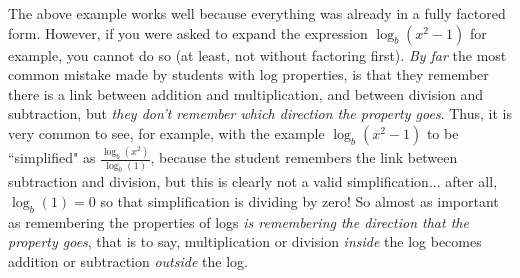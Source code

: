     The above example works well because everything was already in a fully factored form. However, if you were asked to expand the expression $\log_b(x^2-1)$ for example, you cannot do so (at least, not without factoring first). \textit{By far} the most common mistake made by students with log properties, is that they remember there is a link between addition and multiplication, and between division and subtraction, but \textit{they don't remember which direction the property goes}. Thus, it is very common to see, for example, with the example $\log_b(x^2-1)$ to be ``simplified" as $\frac{\log_b(x^2)}{\log_b(1)}$, because the student remembers the link between subtraction and division, but this is clearly not a valid simplification... after all, $\log_b(1) = 0$ so that simplification is dividing by zero! So almost as important as remembering the properties of logs \textit{is remembering the direction that the property goes}, that is to say, multiplication or division \textit{inside} the log becomes addition or subtraction \textit{outside} the log.\\
    
